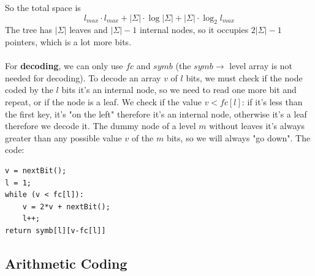 \documentclass[10pt]{report}
\begin{document}
So the total space is $$l_{max}\cdot l_{max} + |\Sigma|\cdot\log|\Sigma| + |\Sigma|\cdot\log_2 l_{max}$$
The tree has $|\Sigma|$ leaves and $|\Sigma|-1$ internal nodes, so it occupies $2|\Sigma|-1$ pointers, which is a lot more bits.\\\\
For \textbf{decoding}, we can only use $fc$ and $symb$ (the $symb\rightarrow$ level array is not needed for decoding). To decode an array $v$ of $l$ bits, we must check if the node coded by the $l$ bits it's an internal node, so we need to read one more bit and repeat, or if the node is a leaf. We check if the value $v < fc[l]$: if it's less than the first key, it's "on the left" therefore it's an internal node, otherwise it's a leaf therefore we decode it. The dummy node of a level $m$ without leaves it's always greater than any possible value $v$ of the $m$ bits, so we will always "go down". The code:
\begin{lstlisting}[style=myPython]
v = nextBit();
l = 1;
while (v < fc[l]):
	v = 2*v + nextBit();
	l++;
return symb[l][v-fc[l]]
\end{lstlisting}
\subsection{Arithmetic Coding}
\end{document}
